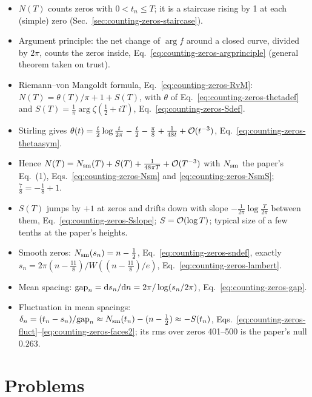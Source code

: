 \begin{itemize}
\item $N(T)$ counts zeros with $0<t_n\le T$; it is a staircase rising by 1 at each (simple) zero (Sec.~\ref{sec:counting-zeros-staircase}).
\item Argument principle: the net change of $\arg f$ around a closed curve, divided by $2\pi$, counts the zeros inside, Eq.~\eqref{eq:counting-zeros-argprinciple} (general theorem taken on trust).
\item Riemann--von Mangoldt formula, Eq.~\eqref{eq:counting-zeros-RvM}: $N(T)=\theta(T)/\pi+1+S(T)$, with $\theta$ of Eq.~\eqref{eq:counting-zeros-thetadef} and $S(T)=\frac1\pi\arg\zeta(\frac12+iT)$, Eq.~\eqref{eq:counting-zeros-Sdef}.
\item Stirling gives $\theta(t)=\frac t2\log\frac t{2\pi}-\frac t2-\frac\pi8+\frac1{48t}+\mathcal{O}(t^{-3})$, Eq.~\eqref{eq:counting-zeros-thetaasym}.
\item Hence $N(T)=N_{\mathrm{sm}}(T)+S(T)+\frac1{48\pi T}+\mathcal{O}(T^{-3})$ with $N_{\mathrm{sm}}$ the paper's Eq.~(1), Eqs.~\eqref{eq:counting-zeros-Nsm} and \eqref{eq:counting-zeros-NsmS}; $\frac78=-\frac18+1$.
\item $S(T)$ jumps by $+1$ at zeros and drifts down with slope $-\frac1{2\pi}\log\frac T{2\pi}$ between them, Eq.~\eqref{eq:counting-zeros-Sslope}; $S=\mathcal{O}(\log T)$; typical size of a few tenths at the paper's heights.
\item Smooth zeros: $N_{\mathrm{sm}}(s_n)=n-\frac12$, Eq.~\eqref{eq:counting-zeros-sndef}, exactly $s_n=2\pi(n-\frac{11}8)/W((n-\frac{11}8)/e)$, Eq.~\eqref{eq:counting-zeros-lambert}.
\item Mean spacing: $\mathrm{gap}_n=\mathrm{d} s_n/\mathrm{d} n=2\pi/\log(s_n/2\pi)$, Eq.~\eqref{eq:counting-zeros-gap}.
\item Fluctuation in mean spacings: $\delta_n=(t_n-s_n)/\mathrm{gap}_n\approx N_{\mathrm{sm}}(t_n)-(n-\frac12)\approx-S(t_n)$, Eqs.~\eqref{eq:counting-zeros-fluct}--\eqref{eq:counting-zeros-faces2}; its rms over zeros 401--500 is the paper's null $0.263$.
\end{itemize}

\section{Problems}\label{sec:counting-zeros-problems}

